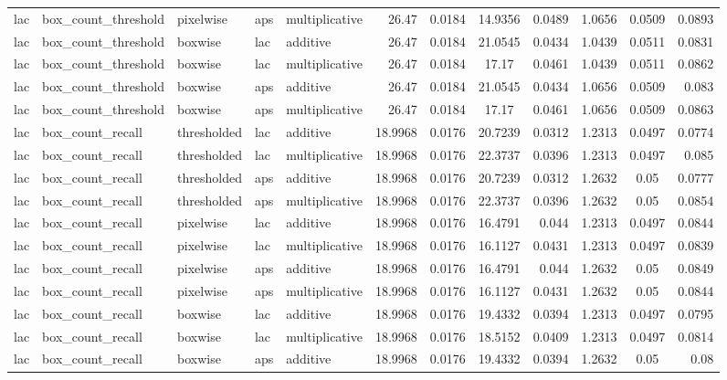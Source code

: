 \begin{table*}[htbp]
\begin{tabular}{@{}lllll rrcrrcr@{}}
lac & box\_count\_threshold & pixelwise & aps & multiplicative & 26.47 & 0.0184 & 14.9356 & 0.0489 & 1.0656 & 0.0509 & 0.0893 \\
lac & box\_count\_threshold & boxwise & lac & additive & 26.47 & 0.0184 & 21.0545 & 0.0434 & 1.0439 & 0.0511 & 0.0831 \\
lac & box\_count\_threshold & boxwise & lac & multiplicative & 26.47 & 0.0184 & 17.17 & 0.0461 & 1.0439 & 0.0511 & 0.0862 \\
lac & box\_count\_threshold & boxwise & aps & additive & 26.47 & 0.0184 & 21.0545 & 0.0434 & 1.0656 & 0.0509 & 0.083 \\
lac & box\_count\_threshold & boxwise & aps & multiplicative & 26.47 & 0.0184 & 17.17 & 0.0461 & 1.0656 & 0.0509 & 0.0863 \\
lac & box\_count\_recall & thresholded & lac & additive & 18.9968 & 0.0176 & 20.7239 & 0.0312 & 1.2313 & 0.0497 & 0.0774 \\
lac & box\_count\_recall & thresholded & lac & multiplicative & 18.9968 & 0.0176 & 22.3737 & 0.0396 & 1.2313 & 0.0497 & 0.085 \\
lac & box\_count\_recall & thresholded & aps & additive & 18.9968 & 0.0176 & 20.7239 & 0.0312 & 1.2632 & 0.05 & 0.0777 \\
lac & box\_count\_recall & thresholded & aps & multiplicative & 18.9968 & 0.0176 & 22.3737 & 0.0396 & 1.2632 & 0.05 & 0.0854 \\
lac & box\_count\_recall & pixelwise & lac & additive & 18.9968 & 0.0176 & 16.4791 & 0.044 & 1.2313 & 0.0497 & 0.0844 \\
lac & box\_count\_recall & pixelwise & lac & multiplicative & 18.9968 & 0.0176 & 16.1127 & 0.0431 & 1.2313 & 0.0497 & 0.0839 \\
lac & box\_count\_recall & pixelwise & aps & additive & 18.9968 & 0.0176 & 16.4791 & 0.044 & 1.2632 & 0.05 & 0.0849 \\
lac & box\_count\_recall & pixelwise & aps & multiplicative & 18.9968 & 0.0176 & 16.1127 & 0.0431 & 1.2632 & 0.05 & 0.0844 \\
lac & box\_count\_recall & boxwise & lac & additive & 18.9968 & 0.0176 & 19.4332 & 0.0394 & 1.2313 & 0.0497 & 0.0795 \\
lac & box\_count\_recall & boxwise & lac & multiplicative & 18.9968 & 0.0176 & 18.5152 & 0.0409 & 1.2313 & 0.0497 & 0.0814 \\
lac & box\_count\_recall & boxwise & aps & additive & 18.9968 & 0.0176 & 19.4332 & 0.0394 & 1.2632 & 0.05 & 0.08 \\

\end{tabular}
\end{table*}
